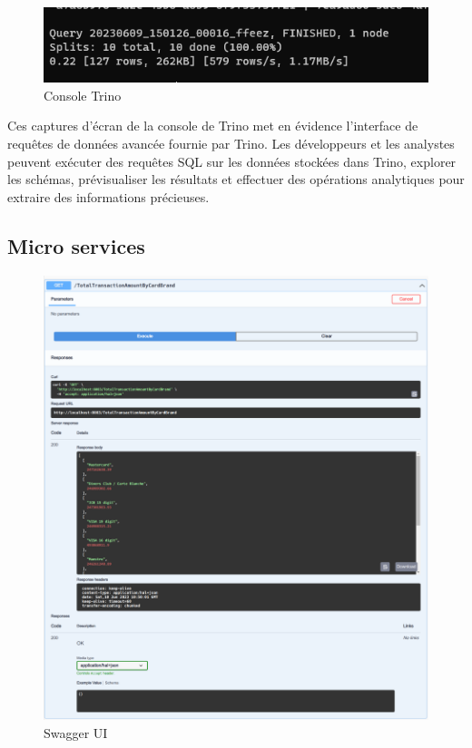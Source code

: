\begin{figure}[H]
\centering
\includegraphics[width=\linewidth]{images/trino-3.png}
\caption{Console Trino}\label{fig:trino-3}
\end{figure}

Ces captures d'écran de la console de Trino met en évidence l'interface de requêtes de données avancée fournie par Trino. Les développeurs et les analystes peuvent exécuter des requêtes SQL sur les données stockées dans Trino, explorer les schémas, prévisualiser les résultats et effectuer des opérations analytiques pour extraire des informations précieuses.

\subsection{Micro services}
\begin{figure}[H]
\centering
\includegraphics[width=\linewidth]{images/Swagger-UI-1.png}
\caption{Swagger UI}\label{fig:swagger-1}
\end{figure}

